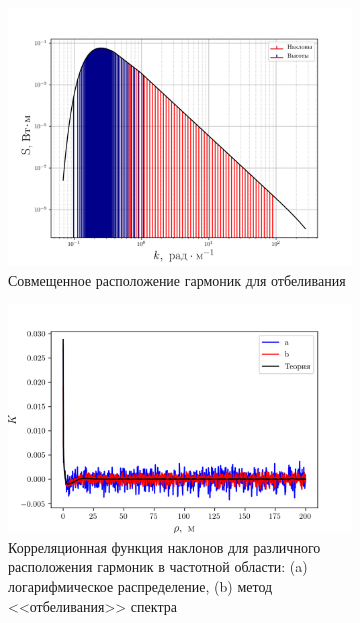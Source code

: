 \begin{figure}[H]
    \begin{subfigure}{0.49\linewidth}
        \includegraphics[width=\linewidth]{fig/fig3}
        \caption{Совмещенное расположение гармоник для отбеливания}
    \end{subfigure}
    \begin{subfigure}{0.49\linewidth}
        \includegraphics[width=\linewidth]{fig/water/whitening}
        \caption{Корреляционная функция наклонов для различного расположения
        гармоник в частотной области: (a) логарифмическое распределение, (b)
    метод <<отбеливания>> спектра}
    \end{subfigure}
    \caption{}
    \label{fig:14}
\end{figure}

